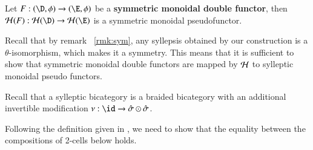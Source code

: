 \documentclass{amsart}
\begin{document}
\begin{lem}\label{lem:symfun}
Let $F:(\D, \phi) \rightarrow (\E, \phi)$ be a {\bf symmetric monoidal double functor}, then $\cH(F): \cH(\D) \rightarrow \cH(\E)$ is a symmetric monoidal pseudofunctor. 
\end{lem}

Recall that by remark ~\ref{rmk:sym}, any syllepsis obtained by our construction is a $\theta$-isomorphism, which makes it a symmetry. This means that it is sufficient to show that symmetric monoidal double functors are mapped by $\mathcal{H}$ to sylleptic monoidal pseudo functors. 

Recall that a sylleptic bicategory is a braided bicategory with an additional invertible modification $\nu: \id \rightarrow \hat{\sigma} \odot \hat{\sigma}$. 

Following the definition given in \cite{mccrudden:bal-coalgb}, 
we need to show that the equality between the compositions of 2-cells below holds. 
\end{document}
